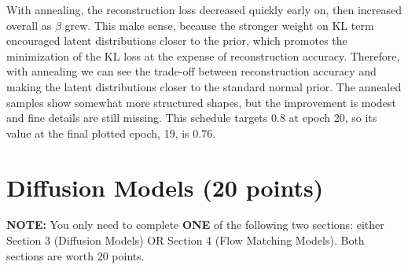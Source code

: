 \documentclass[11pt,addpoints,answers]{exam}
\numberwithin{equation}{section} %
\numberwithin{figure}{section} %
\numberwithin{table}{section} %
\begin{document}
\begin{questions}
\begin{solution}
With annealing, the reconstruction loss decreased quickly early on, then increased overall as $\beta$ grew. This make sense, because the stronger weight on KL term encouraged latent distributions closer to the prior, which promotes the minimization of the KL loss at the expense of reconstruction accuracy. Therefore, with annealing we can see the trade-off between reconstruction accuracy and making the latent distributions closer to the standard normal prior. The annealed samples show somewhat more structured
shapes, but the improvement is modest and fine details are still missing.
This schedule targets $0.8$ at epoch 20, so its value at the final
plotted epoch, 19, is $0.76$.

\end{solution}
\end{questions}
\newpage

\section{Diffusion Models (20 points)}
\begin{notebox}
\textbf{NOTE:} You only need to complete \textbf{ONE} of the following two sections: either Section 3 (Diffusion Models) OR Section 4 (Flow Matching Models). Both sections are worth 20 points.
\end{notebox}
\end{document}
